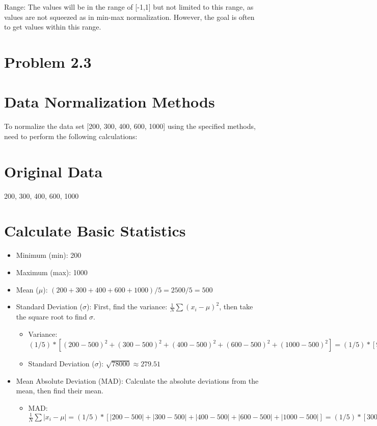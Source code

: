 \documentclass{article}
\begin{document}
Range: The values will be in the range of [-1,1] but not limited to this range, as values are not squeezed as in min-max normalization. However, the goal is often to get values within this range.


\section*{Problem 2.3}



\section*{Data Normalization Methods}


To normalize the data set [200, 300, 400, 600, 1000] using the specified methods, need to perform the following calculations:

\section*{Original Data}
200, 300, 400, 600, 1000

\section*{Calculate Basic Statistics}
\begin{itemize}
  \item Minimum (min): 200
  \item Maximum (max): 1000
  \item Mean ($\mu$): $(200 + 300 + 400 + 600 + 1000) / 5 = 2500 / 5 = 500$
  \item Standard Deviation ($\sigma$): First, find the variance: $\frac{1}{N}\sum (x_i - \mu)^2$, then take the square root to find $\sigma$. 
    \begin{itemize}
      \item Variance: $(1/5)*[(200-500)^2 + (300-500)^2 + (400-500)^2 + (600-500)^2 + (1000-500)^2] = (1/5)*[90000 + 40000 + 10000 + 10000 + 250000] = (1/5)*[390000] = 78000$
      \item Standard Deviation ($\sigma$): $\sqrt{78000} \approx 279.51$
    \end{itemize}
  \item Mean Absolute Deviation (MAD): Calculate the absolute deviations from the mean, then find their mean.
    \begin{itemize}
      \item MAD: $\frac{1}{N}\sum |x_i - \mu| = (1/5)*[|200-500| + |300-500| + |400-500| + |600-500| + |1000-500|] = (1/5)*[300 + 200 + 100 + 100 + 500] = (1/5)*[1200] = 240$
    \end{itemize}
\end{itemize}
\end{document}
